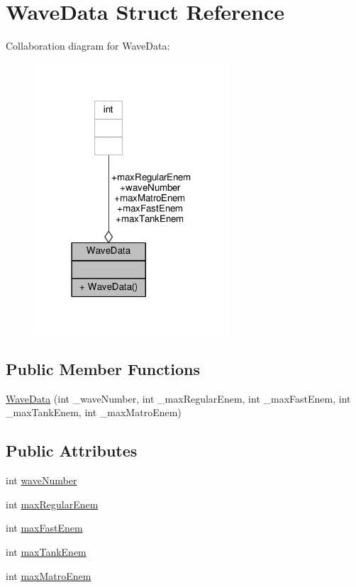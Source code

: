 \hypertarget{struct_wave_data}{\section{Wave\-Data Struct Reference}
\label{struct_wave_data}
}


Collaboration diagram for Wave\-Data\-:
\nopagebreak
\begin{figure}[H]
\begin{center}
\leavevmode
\includegraphics[width=207pt]{struct_wave_data__coll__graph}
\end{center}
\end{figure}
\subsection*{Public Member Functions}
\begin{DoxyCompactItemize}
\item 
\hyperlink{struct_wave_data_a647baf08b28d83d3b71d8abab74468b0}{Wave\-Data} (int \-\_\-wave\-Number, int \-\_\-max\-Regular\-Enem, int \-\_\-max\-Fast\-Enem, int \-\_\-max\-Tank\-Enem, int \-\_\-max\-Matro\-Enem)
\end{DoxyCompactItemize}
\subsection*{Public Attributes}
\begin{DoxyCompactItemize}
\item 
int \hyperlink{struct_wave_data_a5bd42ea00e6a23546c2a952af1b8438b}{wave\-Number}
\item 
int \hyperlink{struct_wave_data_a70b7b4b2a611aa961b4f7c7bbbbcafcb}{max\-Regular\-Enem}
\item 
int \hyperlink{struct_wave_data_a730aa951bab558b2a39ab8cad3e0c6b0}{max\-Fast\-Enem}
\item 
int \hyperlink{struct_wave_data_a85236ef7a2ac44e7364c65e106a341da}{max\-Tank\-Enem}
\item 
int \hyperlink{struct_wave_data_a147372a20a0e0cf2e92e36f9257eb280}{max\-Matro\-Enem}
\end{DoxyCompactItemize}


